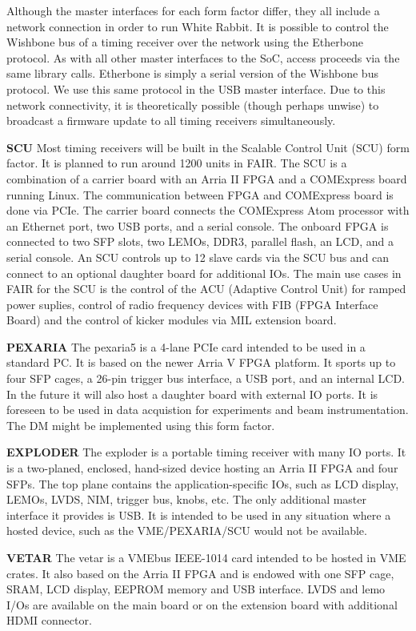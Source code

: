 Although the master interfaces for each form factor differ,
they all include a network connection in order to run White Rabbit.
It is possible to control the Wishbone bus of a timing receiver over
the network using the Etherbone protocol.
As with all other master interfaces to the SoC,
access proceeds via the same library calls.
Etherbone is simply a serial version of the Wishbone bus protocol.
We use this same protocol in the USB master interface.
Due to this network connectivity,
it is theoretically possible (though perhaps unwise)
to broadcast a firmware update to all timing receivers simultaneously.

\textbf{SCU}
Most timing receivers will be built in the 
Scalable Control Unit (SCU) form factor.
It is planned to run around 1200 units in FAIR.
The SCU is a combination of a carrier board with an Arria II FPGA and a
COMExpress board running Linux.
The communication between FPGA and COMExpress board is done via PCIe.
The carrier board connects the COMExpress Atom processor with
an Ethernet port, two USB ports, and a serial console.
The onboard FPGA is connected to two SFP slots, two LEMOs, DDR3, 
parallel flash, an LCD, and a serial console.
An SCU controls up to 12 slave cards via the SCU bus
and can connect to an optional daughter board for additional IOs.
The main use cases in FAIR for the SCU is the control of the ACU
(Adaptive Control Unit) for ramped power suplies,
control of radio frequency devices with FIB (FPGA Interface Board) and
the control of kicker modules via MIL extension board.

\textbf{PEXARIA}
The pexaria5 is a 4-lane PCIe card intended to be used in a standard PC.
It is based on the newer Arria V FPGA platform.
It sports up to four SFP cages, a 26-pin trigger bus interface,
a USB port, and an internal LCD.
In the future it will also host a daughter board with external IO
ports.
It is foreseen to be used in data acquistion for experiments
and beam instrumentation.
The DM might be implemented using this form factor.

\textbf{EXPLODER}
The exploder is a portable timing receiver with many IO ports.
It is a two-planed, enclosed, hand-sized device 
hosting an Arria II FPGA and four SFPs.
The top plane contains the application-specific IOs,
such as LCD display, LEMOs, LVDS, NIM, trigger bus, knobs, etc.
The only additional master interface it provides is USB.
It is intended to be used in any situation where a hosted device,
such as the VME/PEXARIA/SCU would not be available.

\textbf{VETAR}
The vetar is a VMEbus IEEE-1014 card intended to be hosted in VME crates.
It also based on the Arria II FPGA and is endowed with one SFP cage, SRAM, LCD
display, EEPROM memory and USB interface. LVDS and lemo I/Os are available on the main 
board or on the extension board with additional HDMI connector.

